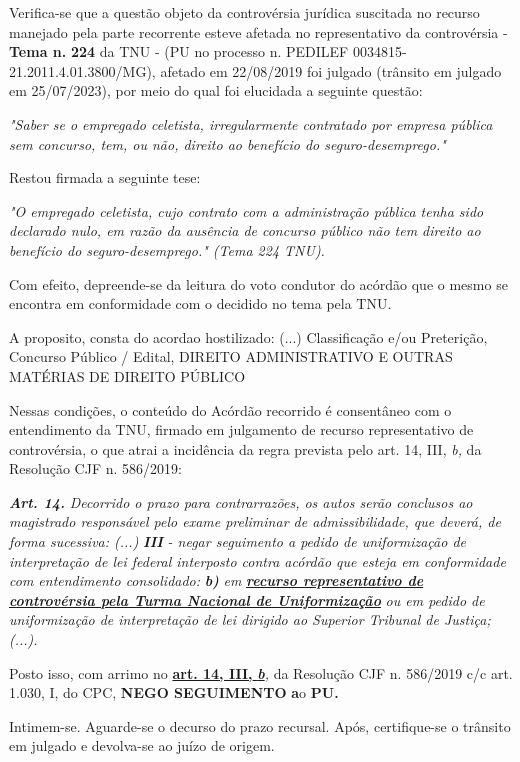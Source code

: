 \documentclass[12pt]{article}
\begin{document}
\justifying
\noindent Verifica-se que a questão objeto da controvérsia jurídica suscitada no recurso manejado pela parte recorrente esteve afetada no representativo da controvérsia - \textbf{Tema n. }\textbf{224} da TNU - (PU no processo n. PEDILEF 0034815-21.2011.4.01.3800/MG),  afetado em 22/08/2019 foi julgado (trânsito em julgado em 25/07/2023), por meio do qual foi elucidada a seguinte questão:

\noindent \textit{"Saber se o empregado celetista, irregularmente contratado por empresa pública sem concurso, tem, ou não, direito ao benefício do seguro-desemprego."}

\noindent Restou firmada a seguinte tese:

\noindent \textit{"O empregado celetista, cujo contrato com a administração pública tenha sido declarado nulo, em razão da ausência de concurso público não tem direito ao benefício do seguro-desemprego." (Tema 224 TNU).}

\noindent Com efeito, depreende-se da leitura do voto condutor do acórdão que o mesmo se encontra em conformidade com o decidido no  tema pela TNU.

\noindent A proposito, consta do acordao hostilizado: (...) Classificação e/ou Preterição, Concurso Público / Edital, DIREITO ADMINISTRATIVO E OUTRAS MATÉRIAS DE DIREITO PÚBLICO

\noindent Nessas condições, o conteúdo do Acórdão recorrido é consentâneo com o entendimento da TNU, firmado em julgamento de recurso representativo de controvérsia, o que atrai a incidência da regra prevista pelo art. 14, III, \textit{b,} da Resolução CJF n. 586/2019:

\noindent \textit{\textbf{Art. 14.}}\textit{ Decorrido o prazo para contrarrazões, os autos serão conclusos ao magistrado responsável pelo exame preliminar de admissibilidade, que deverá, de forma sucessiva: (...) }\textit{\textbf{III }}\textit{- negar seguimento a pedido de uniformização de interpretação de lei federal interposto contra acórdão que esteja em conformidade com entendimento consolidado: }\textit{\textbf{b)}}\textit{ em }\uline{\textit{\textbf{recurso representativo de controvérsia pela Turma Nacional de Uniformização}}}\textit{ ou em pedido de uniformização de interpretação de lei dirigido ao Superior Tribunal de Justiça;(...).}

\noindent Posto isso, com arrimo no \uline{\textbf{art. 14, III, }}\uline{\textit{\textbf{b}}}\textit{,} da Resolução CJF n. 586/2019 c/c art. 1.030, I, do CPC, \textbf{NEGO SEGUIMENTO }\textbf{a}o\textbf{ PU}\textbf{.}

\noindent Intimem-se. Aguarde-se o decurso do prazo recursal. Após, certifique-se o trânsito em julgado e devolva-se ao juízo de origem.
\end{document}
